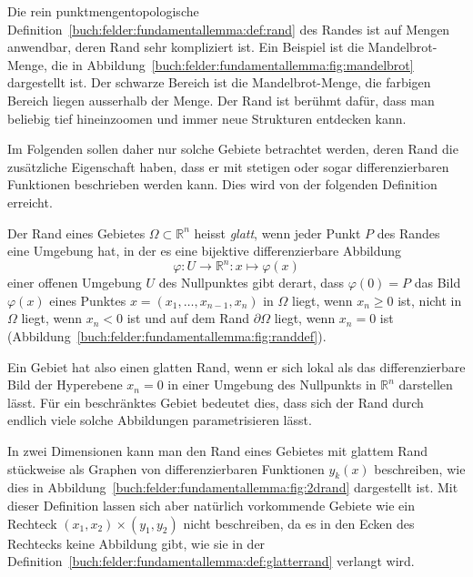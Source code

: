 Die rein punktmengentopologische 
%
Definition~\ref{buch:felder:fundamentallemma:def:rand} des Randes ist
auf Mengen anwendbar, deren Rand sehr kompliziert ist.
Ein Beispiel ist die Mandelbrot-Menge, die in
Abbildung~\ref{buch:felder:fundamentallemma:fig:mandelbrot}
dargestellt ist.
Der schwarze Bereich ist die Mandelbrot-Menge, die farbigen Bereich
liegen ausserhalb der Menge.
Der Rand ist berühmt dafür, dass man beliebig tief hineinzoomen
und immer neue Strukturen entdecken kann.

Im Folgenden sollen daher nur solche Gebiete betrachtet werden,
deren Rand die zusätzliche Eigenschaft haben, dass er mit stetigen
oder sogar differenzierbaren Funktionen beschrieben werden kann.
Dies wird von der folgenden Definition erreicht.


\begin{definition}
\label{buch:felder:fundamentallemma:def:glatterrand}
Der Rand eines Gebietes $\Omega\subset\mathbb{R}^n$ heisst {\em glatt},
wenn jeder Punkt $P$ des Randes eine Umgebung hat, in der es eine bijektive
differenzierbare Abbildung
\[
\varphi
\colon
U\to \mathbb{R}^n 
:
x\mapsto \varphi(x)
\]
einer offenen Umgebung $U$ des Nullpunktes gibt derart, dass $\varphi(0)=P$
das Bild $\varphi(x)$ eines Punktes $x=(x_1,\dots,x_{n-1},x_n)$ in $\Omega$
liegt, wenn $x_n\ge 0$ ist, nicht in $\Omega$ liegt, wenn $x_n<0$ ist und auf
dem Rand $\partial\Omega$ liegt, wenn $x_n=0$ ist
(Abbildung~\ref{buch:felder:fundamentallemma:fig:randdef}).
\end{definition}

Ein Gebiet hat also einen glatten Rand, wenn er sich lokal als das
differenzierbare Bild der Hyperebene $x_n=0$ in einer Umgebung des
Nullpunkts in $\mathbb{R}^n$ darstellen lässt.
Für ein beschränktes Gebiet bedeutet dies, dass sich der Rand durch
endlich viele solche Abbildungen parametrisieren lässt.

In zwei Dimensionen kann man den Rand eines Gebietes mit
glattem Rand stückweise als Graphen von differenzierbaren Funktionen
$y_k(x)$ beschreiben, wie dies in
%
Abbildung~\ref{buch:felder:fundamentallemma:fig:2drand}
dargestellt ist.
Mit dieser Definition lassen sich aber natürlich vorkommende Gebiete
wie ein Rechteck $(x_1,x_2)\times(y_1,y_2)$ nicht beschreiben, da
es in den Ecken des Rechtecks keine Abbildung gibt, wie sie in der
Definition~\ref{buch:felder:fundamentallemma:def:glatterrand}
verlangt wird.

